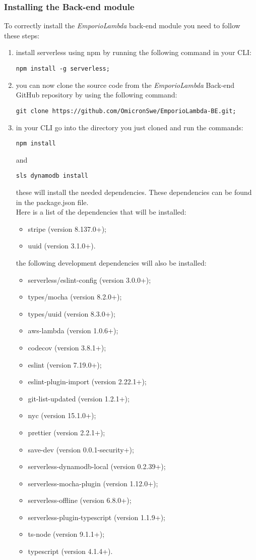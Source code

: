 \subsubsection{Installing the Back-end module}
To correctly install the \textit{EmporioLambda} back-end module you need to follow these steps:
\begin{enumerate}
\item install serverless using npm by running the following command in your CLI:\begin{center}
\texttt{npm install -g serverless;}
\end{center}
\item you can now clone the source code from the \textit{EmporioLambda} Back-end GitHub repository by using the following command:
\begin{center}
\texttt{git clone https://github.com/OmicronSwe/EmporioLambda-BE.git;}
\end{center}
\item in your CLI go into the directory you just cloned and run the commands:
\begin{center}
\texttt{npm install}
\end{center}
and
\begin{center}
\texttt{sls dynamodb install}
\end{center}
these will install the needed dependencies. These dependencies can be found in the package.json file.\\Here is a list of the dependencies that will be installed:
\begin{itemize}
\item stripe (version 8.137.0+);
\item uuid (version 3.1.0+).
\end{itemize}
the following development dependencies will also be installed:
\begin{itemize}
\item serverless/eslint-config (version 3.0.0+);
\item types/mocha (version 8.2.0+);
\item types/uuid (version 8.3.0+);
\item aws-lambda (version 1.0.6+);
\item codecov (version 3.8.1+);
\item eslint (version 7.19.0+);
\item eslint-plugin-import (version 2.22.1+);
\item git-list-updated (version 1.2.1+);
\item nyc (version 15.1.0+);
\item prettier (version 2.2.1+);
\item save-dev (version 0.0.1-security+);
\item serverless-dynamodb-local (version 0.2.39+);
\item serverless-mocha-plugin (version 1.12.0+);
\item serverless-offline (version 6.8.0+);
\item serverless-plugin-typescript (version 1.1.9+);
\item ts-node (version 9.1.1+);
\item typescript (version 4.1.4+).
\end{itemize}
\end{enumerate}